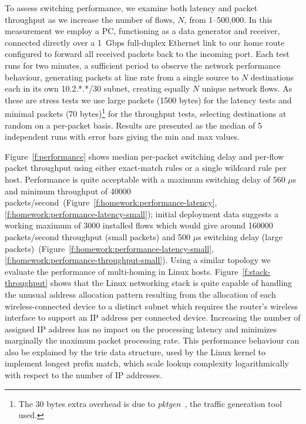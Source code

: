To assess switching performance, we examine both latency and packet throughput
as we increase the number of flows, $N$, from 1--500,000. In this measurement we
employ a PC, functioning as a data generator and receiver, connected directly
over a 1~Gbps full-duplex Ethernet link to our home route configured to forward all
received packets back to the incoming port. 
Each test runs for two minutes, a sufficient period to observe the network
performance behaviour, generating packets at line rate from a single source to
$N$ destinations each in its own 10.2.*.*/30 subnet, creating equally $N$
unique network flows.  As these are stress tests we use large packets (1500
bytes) for the latency tests and minimal packets (70 bytes)\footnote{The 30
bytes extra overhead is due to \emph{pktgen}~, the traffic
generation tool used.} for the throughput tests, selecting destinations at
random on a per-packet basis.  Results are presented as the median of 5
independent runs with error bars giving the min and max values. 

Figure~\ref{f:performance} shows median per-packet switching delay and per-flow
packet throughput using either exact-match rules or a single wildcard rule per
host.  Performance is quite acceptable with a maximum switching delay of 560
$\mu$s and minimum throughput of 40000
packets/second~(Figure~\ref{f:homework:performance-latency},\ref{f:homework:performance-latency-small});
initial deployment data suggests a working maximum of 3000 installed flows
which would give around 160000 packets/second throughput (small packets) and
500 $\mu$s switching delay (large
packets)~(Figure~\ref{f:homework:performance-latency-small},\ref{f:homework:performance-throughput-small}).
Using a similar topology we evaluate the performance of multi-homing in Linux
hosts. Figure~\ref{f:stack-throughput} shows that the Linux networking stack is
quite capable of handling the unusual address allocation pattern resulting from
the allocation of each wireless-connected device to a distinct subnet which
requires the router's wireless interface to support an IP address per connected
device. Increasing the number of assigned IP address has no impact on the
processing latency and minimizes marginally the maximum packet processing rate.
This performance behaviour can also be explained by the trie data structure,
used by the Linux kernel to implement longest prefix match, which scale lookup
complexity logarithmically with respect to the number of IP addresses. 

